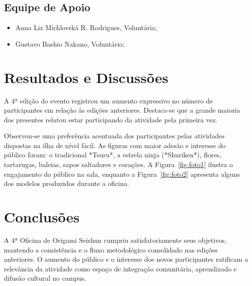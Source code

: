 \documentclass[12pt, a4paper]{article}
\begin{document}
\subsection*{Equipe de Apoio}
\begin{itemize}[leftmargin=*]
    \item Anna Liz Michlovská R. Rodrigues, Voluntária;
    \item Gustavo Bashio Nakano, Voluntário;
\end{itemize}

\section{Resultados e Discussões}
A 4ª edição do evento registrou um aumento expressivo no número de participantes em relação às edições anteriores. Destaca-se que a grande maioria dos presentes relatou estar participando da atividade pela primeira vez. 

Observou-se uma preferência acentuada dos participantes pelas atividades dispostas na ilha de nível fácil. As figuras com maior adesão e interesse do público foram: o tradicional *Tsuru*, a estrela ninja (*Shuriken*), flores, tartarugas, baleias, sapos saltadores e corações. A Figura~\ref{fig:foto1} ilustra o engajamento do público na sala, enquanto a Figura~\ref{fig:foto2} apresenta alguns dos modelos produzidos durante a oficina.

\section{Conclusões}
A 4ª Oficina de Origami Seishun cumpriu satisfatoriamente seus objetivos, mantendo a consistência e o fluxo metodológico consolidado nas edições anteriores. O aumento do público e o interesse dos novos participantes ratificam a relevância da atividade como espaço de integração comunitária, aprendizado e difusão cultural no campus.
\end{document}
